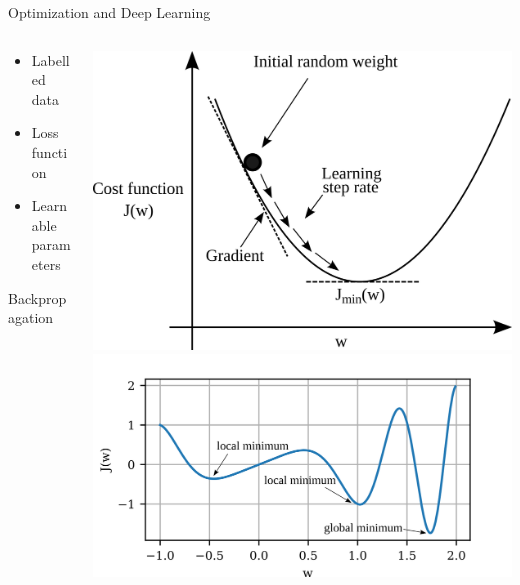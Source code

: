 \documentclass[10pt,aspectratio=169,dvipsnames]{beamer} %
\begin{document}
	\setcounter{subfigure}{0}
	\begin{frame}{Optimization and Deep Learning}
		\begin{columns}[T]
			\begin{column}[c]{.5\textwidth}
				\begin{itemize}
					\item \alert{Labelled data} 
					\item \alert{Loss function}
					\item \alert{Learnable parameters}
				\end{itemize}
				\begin{block}{Backpropagation}
					\begin{figure}
						\centering
					\end{figure}
				\end{block}
			\end{column}
			\begin{column}[t]{.5\textwidth}
				\centering
				\includegraphics[height=0.40\textheight]{Gradient_decent.png}
				\\
				\includegraphics[height=0.40\textheight]{local_minima.png}
			\end{column}
		\end{columns}		
	\end{frame}
\end{document}

